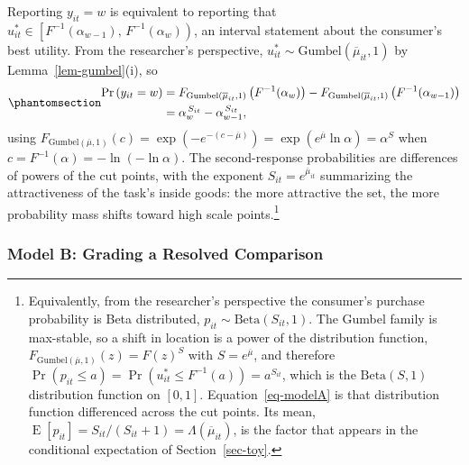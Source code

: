 \documentclass[
  letterpaper,
  DIV=11,
  numbers=noendperiod]{scrartcl}
\theoremstyle{plain}
\theoremstyle{plain}
\theoremstyle{remark}
\begin{document}
Reporting \(y_{it}=w\) is equivalent to reporting that
\(u^*_{it} \in \left[ F^{-1}(\alpha_{w-1}), \, F^{-1}(\alpha_w) \right)\),
an interval statement about the consumer's best utility. From the
researcher's perspective,
\(u^*_{it} \sim \text{Gumbel}(\overline{\mu}_{it},1)\) by
Lemma~\ref{lem-gumbel}(i), so
\begin{equation}\protect\phantomsection\label{eq-modelA}{
\begin{aligned}
\Pr \left( y_{it} = w \right)
&= F_{\text{Gumbel}(\overline{\mu}_{it},1)} \left( F^{-1}(\alpha_w) \right) - F_{\text{Gumbel}(\overline{\mu}_{it},1)} \left( F^{-1}(\alpha_{w-1}) \right) \\
&= \alpha_w^{\,S_{it}} - \alpha_{w-1}^{\,S_{it}},
\end{aligned}
}\end{equation} using
\(F_{\text{Gumbel}(\overline{\mu},1)}(c) = \exp\left(-e^{-(c - \overline{\mu})}\right) = \exp\left( e^{\overline{\mu}} \ln \alpha \right) = \alpha^{S}\)
when \(c = F^{-1}(\alpha) = -\ln(-\ln \alpha)\). The second-response
probabilities are differences of powers of the cut points, with the
exponent \(S_{it} = e^{\overline{\mu}_{it}}\) summarizing the
attractiveness of the task's inside goods: the more attractive the set,
the more probability mass shifts toward high scale points.\footnote{Equivalently,
  from the researcher's perspective the consumer's purchase probability
  is Beta distributed,
  \(p_{it} \sim \text{Beta}\left(S_{it}, 1\right)\). The Gumbel family
  is max-stable, so a shift in location is a power of the distribution
  function, \(F_{\text{Gumbel}(\overline{\mu},1)}(z) = F(z)^{S}\) with
  \(S = e^{\overline{\mu}}\), and therefore
  \(\Pr \left( p_{it} \le a \right) = \Pr \left( u^*_{it} \le F^{-1}(a) \right) = a^{S_{it}}\),
  which is the \(\text{Beta}(S,1)\) distribution function on \([0,1]\).
  Equation~\ref{eq-modelA} is that distribution function differenced
  across the cut points. Its mean,
  \(\operatorname{E}\left[ p_{it} \right] = S_{it} \big/ \left( S_{it}+1 \right) = \Lambda \left( \overline{\mu}_{it} \right)\),
  is the factor that appears in the conditional expectation of
  Section~\ref{sec-toy}.}

\subsubsection{Model B: Grading a Resolved Comparison}\label{sec-modelB}
\end{document}
